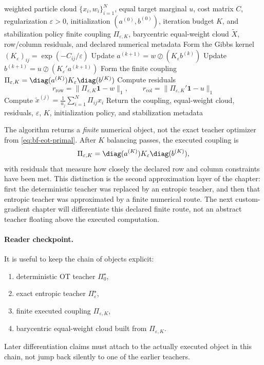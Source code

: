 \begin{algorithm}[ht]
\caption{\texttt{sinkhorn\_equalweight\_step}}
\begin{algorithmic}[1]
\Require weighted particle cloud \(\{x_i,w_i\}_{i=1}^N\), equal target marginal \(u\), cost matrix \(C\), regularization \(\varepsilon>0\), initialization \((a^{(0)},b^{(0)})\), iteration budget \(K\), and stabilization policy
\Ensure finite coupling \(\Pi_{\varepsilon,K}\), barycentric equal-weight cloud \(\widetilde X\), row/column residuals, and declared numerical metadata
\State Form the Gibbs kernel \((K_\varepsilon)_{ij}=\exp(-C_{ij}/\varepsilon)\)
  \State Update \(a^{(k+1)} = w \oslash (K_\varepsilon b^{(k)})\)
  \State Update \(b^{(k+1)} = u \oslash (K_\varepsilon' a^{(k+1)})\)
\EndFor
\State Form the finite coupling \(\Pi_{\varepsilon,K}=\diag(a^{(K)})K_\varepsilon\diag(b^{(K)})\)
\State Compute residuals
\[
  r_{\mathrm{row}}=\|\Pi_{\varepsilon,K}\mathbf 1-w\|_1,
  \qquad
  r_{\mathrm{col}}=\|\Pi_{\varepsilon,K}'\mathbf 1-u\|_1
\]
  \State Compute \(\tilde x^{(j)} = \frac{1}{u_j}\sum_{i=1}^N \Pi_{ij}x_i\)
\EndFor
\State Return the coupling, equal-weight cloud, residuals, \(\varepsilon\), \(K\), initialization policy, and stabilization metadata
\end{algorithmic}
\end{algorithm}

The algorithm returns a \emph{finite} numerical object, not the exact teacher
optimizer from \eqref{eq:bf-eot-primal}.  After \(K\) balancing passes, the
executed coupling is
\begin{equation}
\label{eq:bf-eot-finite-coupling-repeat}
  \Pi_{\varepsilon,K}
  =
  \diag(a^{(K)})K_\varepsilon\diag(b^{(K)}),
\end{equation}
with residuals that measure how closely the declared row and column constraints
have been met.  This distinction is the second approximation layer of the chapter:
first the deterministic teacher was replaced by an entropic teacher, and then that
entropic teacher was approximated by a finite numerical route.  The next custom-
gradient chapter will differentiate this declared finite route, not an abstract
teacher floating above the executed computation.

\paragraph{Reader checkpoint.}
It is useful to keep the chain of objects explicit:
\begin{enumerate}[label=(\roman*)]
  \item deterministic OT teacher \(\Pi_0^\star\),
  \item exact entropic teacher \(\Pi_\varepsilon^\star\),
  \item finite executed coupling \(\Pi_{\varepsilon,K}\),
  \item barycentric equal-weight cloud built from \(\Pi_{\varepsilon,K}\).
\end{enumerate}
Later differentiation claims must attach to the actually executed object in this
chain, not jump back silently to one of the earlier teachers.

